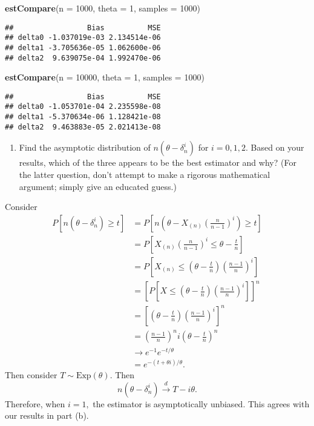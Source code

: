 \documentclass[12pt,]{article}
\newenvironment{Shaded}{\begin{snugshade}}{\end{snugshade}}
\newcommand{\DataTypeTok}[1]{\textcolor[rgb]{0.13,0.29,0.53}{#1}}
\newcommand{\DecValTok}[1]{\textcolor[rgb]{0.00,0.00,0.81}{#1}}
\newcommand{\KeywordTok}[1]{\textcolor[rgb]{0.13,0.29,0.53}{\textbf{#1}}}
\newcommand{\NormalTok}[1]{#1}
\providecommand{\tightlist}{%
  \setlength{\itemsep}{0pt}\setlength{\parskip}{0pt}}
\begin{document}
\begin{Shaded}
\begin{Highlighting}[]
\KeywordTok{estCompare}\NormalTok{(}\DataTypeTok{n =} \DecValTok{1000}\NormalTok{, }\DataTypeTok{theta =} \DecValTok{1}\NormalTok{, }\DataTypeTok{samples =} \DecValTok{1000}\NormalTok{)}
\end{Highlighting}
\end{Shaded}

\begin{verbatim}
##                 Bias          MSE
## delta0 -1.037019e-03 2.134514e-06
## delta1 -3.705636e-05 1.062600e-06
## delta2  9.639075e-04 1.992470e-06
\end{verbatim}

\begin{Shaded}
\begin{Highlighting}[]
\KeywordTok{estCompare}\NormalTok{(}\DataTypeTok{n =} \DecValTok{10000}\NormalTok{, }\DataTypeTok{theta =} \DecValTok{1}\NormalTok{, }\DataTypeTok{samples =} \DecValTok{1000}\NormalTok{)}
\end{Highlighting}
\end{Shaded}

\begin{verbatim}
##                 Bias          MSE
## delta0 -1.053701e-04 2.235598e-08
## delta1 -5.370634e-06 1.128421e-08
## delta2  9.463883e-05 2.021413e-08
\end{verbatim}

\begin{enumerate}
\def\labelenumi{(\alph{enumi})}
\setcounter{enumi}{2}
\tightlist
\item
  Find the asymptotic distribution of \(n(\theta-\delta_n^i)\) for
  \(i=0,1,2\). Based on your results, which of the three appears to be
  the best estimator and why? (For the latter question, don't attempt to
  make a rigorous mathematical argument; simply give an educated guess.)
\end{enumerate}

Consider \begin{align*}
P[n(\theta-\delta_n^i)\ge t] & = P\left[n\left(\theta - X_{(n)}\left(\frac{n}{n-1}\right)^i\right)\ge t\right]\\
& = P\left[X_{(n)}\left(\frac{n}{n-1}\right)^i \le \theta - \frac{t}{n}\right]\\
& = P\left[X_{(n)}\le \left(\theta - \frac{t}{n}\right)\left(\frac{n-1}{n}\right)^i\right]\\
& = \left[P\left[X\le \left(\theta - \frac{t}{n}\right)\left(\frac{n-1}{n}\right)^i\right]\right]^n\\
& = \left[\left(\theta - \frac{t}{n}\right)\left(\frac{n-1}{n}\right)^i\right]^n\\
& = \left(\frac{n-1}{n}\right)^ni\left(\theta - \frac{t}{n}\right)^n\\
& \rightarrow e^{-1}e^{-t/\theta}\\
& = e^{-(t+\theta i)/\theta}.
\end{align*} Then consider \(T\sim \text{Exp}(\theta).\) Then
\[n(\theta-\delta_n^i)\overset{d}\rightarrow T-i\theta.\] Therefore,
when \(i=1,\) the estimator is asymptotically unbiased. This agrees with
our results in part (b).
\end{document}
